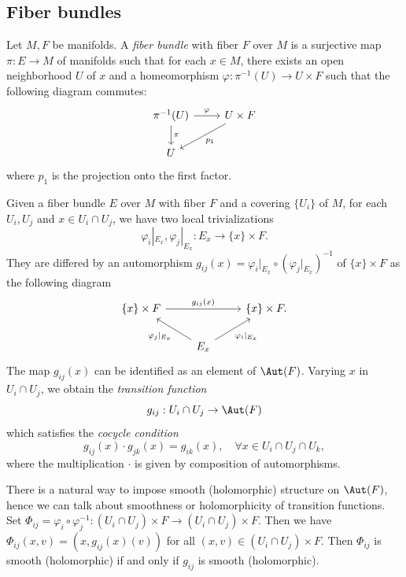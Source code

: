 \subsection{Fiber bundles}

\begin{definition}\label{def:fiber_bundle_over_manifolds}
	Let \(M,F\) be manifolds.
	A \emph{fiber bundle} with fiber \(F\) over \(M\) is a surjective map \(\pi: E \to M\) of manifolds
	such that for each \(x \in M\), there exists an open neighborhood \(U\) of \(x\) and a homeomorphism
	\(\varphi: \pi^{-1}(U) \to U \times F\) such that the following diagram commutes:
	\[
		\begin{tikzcd}
			\pi^{-1}(U) \arrow{r}{\varphi} \arrow{d}{\pi} & U \times F \arrow{dl}{p_1}  \\
			U &
		\end{tikzcd}
	\]
	where \(p_1\) is the projection onto the first factor.
\end{definition}

Given a fiber bundle \(E\) over \(M\) with fiber \(F\) and a covering \(\{U_i\}\) of \(M\), for each \(U_i,U_j\) and \(x \in U_i \cap U_j\), we have two local trivializations
\[
	\varphi_i|_{E_x}, \varphi_j|_{E_x}: E_x \to \{x\} \times F.
\]
They are differed by an automorphism \(g_{ij}(x) = \varphi_i|_{E_x} \circ (\varphi_j|_{E_x})^{-1}\) of \(\{x\} \times F\) as the following diagram
\[
	\begin{tikzcd}
		\{x\} \times F \arrow[rr,"g_{ij}(x)"] & & \{x\} \times F. \\
		& E_x \arrow[lu,"\varphi_j|_{E_x}"] \arrow[ru,swap,"\varphi_i|_{E_x}"] &
	\end{tikzcd}
\]
The map \(g_{ij}(x)\) can be identified as an element of \(\Aut(F)\).
Varying \(x\) in \(U_i \cap U_j\), we obtain the \emph{transition function}
\[
	g_{ij}: U_i \cap U_j \to \Aut(F)
\]
which satisfies the \emph{cocycle condition}
\[
	g_{ij}(x) \cdot g_{jk}(x) = g_{ik}(x), \quad \forall x \in U_i \cap U_j \cap U_k,
\]
where the multiplication \(\cdot\) is given by composition of automorphisms.

There is a natural way to impose smooth (holomorphic) structure on \(\Aut(F)\),
hence we can talk about smoothness or holomorphicity of transition functions.
Set \(\Phi_{ij} = \varphi_i \circ \varphi_j^{-1}: (U_i \cap U_j) \times F \to (U_i \cap U_j) \times F\).
Then we have \(\Phi_{ij}(x,v) = (x, g_{ij}(x)(v))\) for all \((x,v) \in (U_i \cap U_j) \times F\).
Then \(\Phi_{ij}\) is smooth (holomorphic) if and only if \(g_{ij}\) is smooth (holomorphic).

